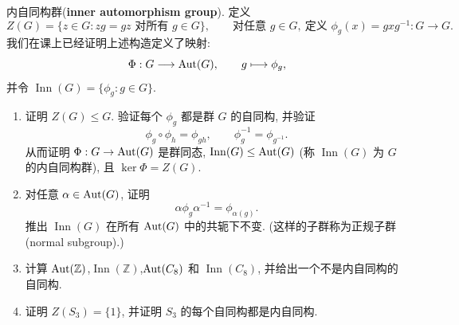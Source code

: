 \documentclass{article}
\begin{document}
\begin{problem}
  {\heiti 内自同构群}(\textbf{inner automorphism group}). 定义
  \[
    Z(G)=\{z\in G:zg=gz\text{ 对所有 }g\in G\},\qquad
    \text{对任意 }g\in G,\ \text{定义 }\phi_g(x)=gxg^{-1}:G\to G.
  \]
  我们在课上已经证明上述构造定义了映射:
  \[
    \Phi:G\longrightarrow\operatorname{Aut}(G),\qquad g\longmapsto\phi_g,
  \]
  并令 $\operatorname{Inn}(G)=\{\phi_g:g\in G\}$.
  \begin{enumerate}
    \item[(a)] 证明 $Z(G)\leq G$. 验证每个 $\phi_g$ 都是群 $G$ 的自同构, 并验证
      \[
        \phi_g\circ\phi_h=\phi_{gh},\qquad \phi_g^{-1}=\phi_{g^{-1}}.
      \]
      从而证明 $\Phi:G\to\operatorname{Aut}(G)$ 是群同态, $\operatorname{Inn}(G)\leq\operatorname{Aut}(G)$ (称 $\operatorname{Inn}(G)$ 为 $G$ 的内自同构群), 且 $\ker\Phi=Z(G)$.
    \item[(b)] 对任意 $\alpha\in\operatorname{Aut}(G)$, 证明
      \[
        \alpha\phi_g\alpha^{-1}=\phi_{\alpha(g)}.
      \]
      推出 $\operatorname{Inn}(G)$ 在所有 $\operatorname{Aut}(G)$ 中的共轭下不变. (这样的子群称为正规子群(normal subgroup).)
    \item[(c)] 计算 $\operatorname{Aut}(\mathbb Z)$,$\operatorname{Inn}(\mathbb Z)$,$\operatorname{Aut}(C_8)$ 和 $\operatorname{Inn}(C_8)$, 并给出一个不是内自同构的自同构.
    \item[(d)] 证明 $Z(S_3)=\{1\}$, 并证明 $S_3$ 的每个自同构都是内自同构.
  \end{enumerate}
\end{problem}
\end{document}

